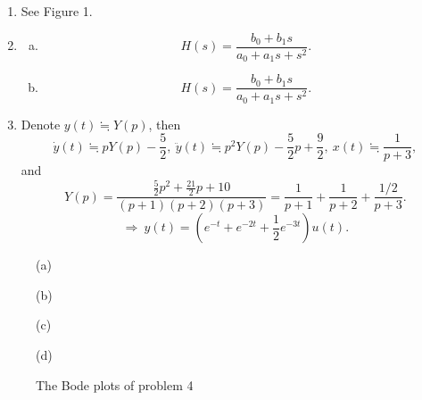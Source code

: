 \documentclass{article}
\begin{document}
\begin{enumerate}
            \item See Figure 1.

            \item 
            \begin{enumerate}[(a)]
                \item \[
                    H(s) = \frac{b_0 + b_1s}{a_0 + a_1 s + s^2}.
                \]
                \item \[
                    H(s) = \frac{b_0 + b_1s}{a_0 + a_1 s + s^2}.
                \]
            \end{enumerate}	
            
            \item Denote $y(t) \fallingdotseq Y(p)$, then \[
                \dot{y}(t) \fallingdotseq pY(p) - \frac{5}{2},\ 
                \ddot{y}(t) \fallingdotseq p^2 Y(p) - \frac{5}{2} p + \frac{9}{2},\ 
                x(t) \fallingdotseq \frac{1}{p+3},
            \]
            and \[
                Y(p) = \frac{\frac{5}{2}p^2 + \frac{21}{2} p + 10}{(p+1)(p+2)(p+3)}
                = \frac{1}{p+1} + \frac{1}{p+2} + \frac{1 / 2}{p+3}.
            \]
            \[
                \Rightarrow\ y(t) = \left( e^{-t} + e^{-2t} + \frac{1}{2}e^{-3t}\right) u(t).
            \]
            
        \end{enumerate}
        
        \vspace{2em}
        \begin{figure}[htbp]
            \centering
            \begin{minipage}{.49\textwidth}
                \centering
                
                \vspace{-2em}
                (a)
            \end{minipage}
            \begin{minipage}{.49\textwidth}
                \centering
                
                \vspace{-2em}
                (b)
            \end{minipage}
            \begin{minipage}{.49\textwidth}
                \centering
                
                \vspace{-2em}
                (c)
            \end{minipage}
            \begin{minipage}{.49\textwidth}
                \centering
                
                \vspace{-2em}
                (d)
            \end{minipage}
            \caption{The Bode plots of problem 4}
        \end{figure}
        \newpage
        
\end{document}
